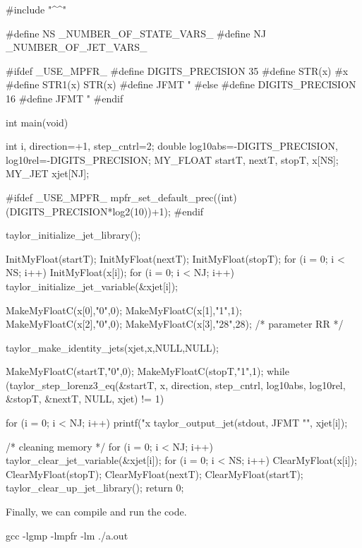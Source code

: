 \documentclass[10pt]{article}
\theoremstyle{remark}
\newcommand{\mainfile}{}
\newcommand{\odecfile}{}
\newcommand{\odehfile}{}
\begin{document}
\begin{code}[title={File: \mainfile{}}]
    #include "^\odehfile{}^"
        
    #define NS _NUMBER_OF_STATE_VARS_
    #define NJ _NUMBER_OF_JET_VARS_
    
    #ifdef _USE_MPFR_
    #define DIGITS_PRECISION 35
    #define STR(x) #x
    #define STR1(x) STR(x)
    #define JFMT "%
    #else 
    #define DIGITS_PRECISION 16
    #define JFMT "%
    #endif
    
    int main(void)
    {
      int i, direction=+1, step_cntrl=2;
      double log10abs=-DIGITS_PRECISION, log10rel=-DIGITS_PRECISION;
      MY_FLOAT startT, nextT, stopT, x[NS];
      MY_JET xjet[NJ];
      
    #ifdef _USE_MPFR_
      mpfr_set_default_prec((int)(DIGITS_PRECISION*log2(10))+1);
    #endif
      
      taylor_initialize_jet_library();
      
      InitMyFloat(startT); InitMyFloat(nextT); InitMyFloat(stopT);
      for (i = 0; i < NS; i++) {InitMyFloat(x[i]);}    
      for (i = 0; i < NJ; i++) {taylor_initialize_jet_variable(&xjet[i]);}
      
      MakeMyFloatC(x[0],"0",0);
      MakeMyFloatC(x[1],"1",1);
      MakeMyFloatC(x[2],"0",0); 
      MakeMyFloatC(x[3],"28",28); /* parameter RR */
      
      taylor_make_identity_jets(xjet,x,NULL,NULL);
      
      MakeMyFloatC(startT,"0",0);
      MakeMyFloatC(stopT,"1",1);
      while (taylor_step_lorenz3_eq(&startT, x, direction, 
                                    step_cntrl, log10abs, log10rel, 
                                    &stopT, &nextT, NULL, xjet) != 1) {}
      
      for (i = 0; i < NJ; i++) {
        printf("x%
        taylor_output_jet(stdout, JFMT "\n", xjet[i]);
      }
      
      /* cleaning memory */
      for (i = 0; i < NJ; i++) {taylor_clear_jet_variable(&xjet[i]);}
      for (i = 0; i < NS; i++)  {ClearMyFloat(x[i]);}
      ClearMyFloat(stopT); ClearMyFloat(nextT); ClearMyFloat(startT); 
      taylor_clear_up_jet_library();
      return 0;
    } 
\end{code}
Finally, we can compile and run the code.
\begin{command}
    gcc \mainfile{} \odecfile{} -lgmp -lmpfr -lm
    ./a.out
\end{command}
\end{document}
